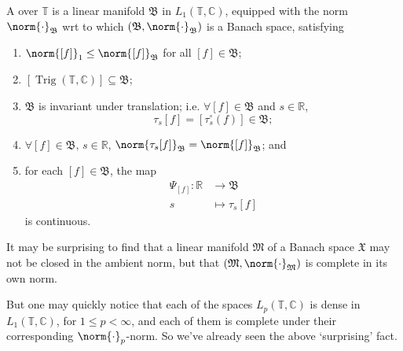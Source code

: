 \documentclass[notoc,notitlepage]{tufte-book}
\DeclareMathOperator{\Trig}{Trig}
\begin{document}
\begin{defn}\label{defn:homogeneous_banach_spaces}
  A  over $\mathbb{T}$
  is a linear manifold $\mathfrak{B}$ in $L_1(\mathbb{T}, \mathbb{C})$,
  equipped with the norm $\norm{\cdot}_{\mathfrak{B}}$
  wrt to which $(\mathfrak{B}, \norm{\cdot}_{\mathfrak{B}})$ is a Banach space,
  satisfying
  \begin{enumerate}
    \item $\norm{[f]}_1 \leq \norm{[f]}_{\mathfrak{B}}$ for all $[f] \in \mathfrak{B}$;
    \item $[\Trig(\mathbb{T}, \mathbb{C})] \subseteq \mathfrak{B}$;
    \item $\mathfrak{B}$ is invariant under translation; i.e.
      $\forall [f] \in \mathfrak{B}$ and $s \in \mathbb{R}$,
      \begin{equation*}
        \tau_s[f] = [\tau_s^{\circ}(f)] \in \mathfrak{B};
      \end{equation*}
    \item $\forall [f] \in \mathfrak{B},\, s \in \mathbb{R}$,
      $\norm{\tau_s[f]}_{\mathfrak{B}} = \norm{[f]}_{\mathfrak{B}}$; and
    \item for each $[f] \in \mathfrak{B}$, the map
      \begin{align*}
        \Psi_{[f]} : \mathbb{R} &\to \mathfrak{B} \\
                s &\mapsto \tau_s[f]
      \end{align*}
      is continuous.
  \end{enumerate}
\end{defn}

\begin{remark}
  It may be surprising to find that
  a linear manifold $\mathfrak{M}$ of a Banach space $\mathfrak{X}$
  may not be closed in the ambient norm,
  but that $(\mathfrak{M}, \norm{\cdot}_{\mathfrak{M}})$ is complete
  in its own norm.

  But one may quickly notice
  that each of the spaces $L_p(\mathbb{T}, \mathbb{C})$
  is dense in $L_1(\mathbb{T}, \mathbb{C})$, for $1 \leq p < \infty$,
  and each of them is complete under their corresponding $\norm{\cdot}_p$-norm.
  So we've already seen the above `surprising' fact.
\end{remark}
\end{document}
